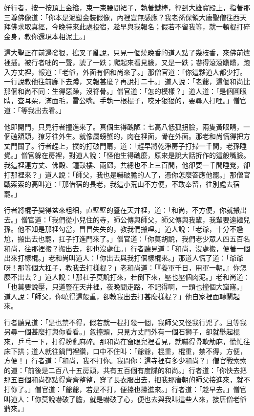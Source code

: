 好行者，按一按頂上金箍，束一束腰間裙子，執著鐵棒，徑到大雄寶殿上，指著那三尊佛像道：「你本是泥塑金裝假像，內裡豈無感應？我老孫保領大唐聖僧往西天拜佛求取真經，今晚特來此處投宿，趁早與我報名；假若不留我等，就一頓棍打碎金身，教你還現本相泥土。」

這大聖正在前邊發狠，搗叉子亂說，只見一個燒晚香的道人點了幾枝香，來佛前爐裡插。被行者咄的一聲，諕了一跌；爬起來看見臉，又是一跌；嚇得滾滾蹡蹡，跑入方丈裡，報道：「老爺，外面有個和尚來了。」那僧官道：「你這夥道人都少打。一行說教他往前廊下去蹲，又報甚麼？再說打二十。」道人說：「老爺，這個和尚比那個和尚不同：生得惡躁，沒脊骨。」僧官道：「怎的模樣？」道人道：「是個圓眼睛，查耳朵，滿面毛，雷公嘴。手執一根棍子，咬牙狠狠的，要尋人打哩。」僧官道：「等我出去看。」

他即開門，只見行者撞進來了。真個生得醜陋：七高八低孤拐臉，兩隻黃眼睛，一個磕額頭，獠牙往外生。就像屬螃蟹的，肉在裡面，骨在外面。那老和尚慌得把方丈門關了。行者趕上，撲的打破門扇，道：「趕早將乾淨房子打掃一千間，老孫睡覺。」僧官躲在房裡，對道人說：「怪他生得醜麼，原來是說大話折作的這般嘴臉。我這裡連方丈、佛殿、鐘鼓樓、兩廊，共總也不上三百間，他卻要一千間睡覺，卻打那裡來？」道人說：「師父，我也是嚇破膽的人了，憑你怎麼答應他罷。」那僧官戰索索的高叫道：「那借宿的長老，我這小荒山不方便，不敢奉留，往別處去宿罷。」

行者將棍子變得盆來粗細，直壁壁的豎在天井裡，道：「和尚，不方便，你就搬出去。」僧官道：「我們從小兒住的寺，師公傳與師父，師父傳與我輩，我輩要遠繼兒孫。他不知是那裡勾當，冒冒失失的，教我們搬哩。」道人說：「老爺，十分不尷尬，搬出去也罷，扛子打進門來了。」僧官道：「你莫胡說，我們老少眾人四五百名和尚，往那裡搬？搬出去，卻也沒處住。」行者聽見道：「和尚，沒處搬，便著一個出來打樣棍。」老和尚叫道人：「你出去與我打個樣棍來。」那道人慌了道：「爺爺呀！那等個大杠子，教我去打樣棍？」老和尚道：「『養軍千日，用軍一朝。』你怎麼不出去？」道人說：「那杠子莫說打來，若倒下來，壓也壓個肉泥。」老和尚道：「也莫要說壓，只道豎在天井裡，夜晚間走路，不記得啊，一頭也撞個大窟窿。」道人說：「師父，你曉得這般重，卻教我出去打甚麼樣棍？」他自家裡面轉鬧起來。

行者聽見道：「是也禁不得，假若就一棍打殺一個，我師父又怪我行兇了。且等我另尋一個甚麼打與你看看。」忽擡頭，只見方丈門外有一個石獅子，卻就舉起棍來，乒乓一下，打得粉亂麻碎。那和尚在窗眼兒裡看見，就嚇得骨軟觔麻，慌忙往床下拱；道人就往鍋門裡鑽，口中不住叫：「爺爺，棍重，棍重，禁不得，方便，方便！」行者道：「和尚，我不打你。我問你：這寺裡有多少和尚？」僧官戰索索的道：「前後是二百八十五房頭，共有五百個有度牒的和尚。」行者道：「你快去把那五百個和尚都點得齊齊整整，穿了長衣服出去，把我那唐朝的師父接進來，就不打你了。」僧官道：「爺爺，若是不打，便擡也擡進來。」行者道：「趁早去。」僧官叫道人：「你莫說嚇破了膽，就是嚇破了心，便也去與我叫這些人來，接唐僧老爺爺來。」

